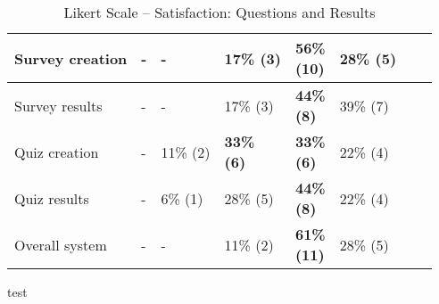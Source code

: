\begin{table}[h!]
{\begin{tabular}{| C{8cm} |p{0.7cm}|p{0.7cm}|p{0.7cm}|p{0.7cm}|p{0.7cm}|p{0.7cm}|p{0.7cm}|}
\hline Survey creation
	& - & - & 17\% \newline (3) & \textbf{56\% \newline (10)} & 28\% \newline (5) \\
\hline Survey results
	& - & - & 17\% \newline (3) & \textbf{44\% \newline (8)} & 39\% \newline (7) \\
\hline Quiz creation
	& - & 11\% \newline (2) & \textbf{33\% \newline (6)} & \textbf{33\% \newline (6)} & 22\% \newline (4) \\
\hline Quiz results
	& - & 6\% \newline (1) & 28\% \newline (5) & \textbf{44\% \newline (8)} & 22\% \newline (4) \\
\hline Overall system
	& - & - & 11\% \newline (2) & \textbf{61\% \newline (11)} & 28\% \newline (5) \\
\hline
\end{tabular}
}
\caption{Likert Scale -- Satisfaction: Questions and Results}
\label{table:satisfaction}
\end{table}

test